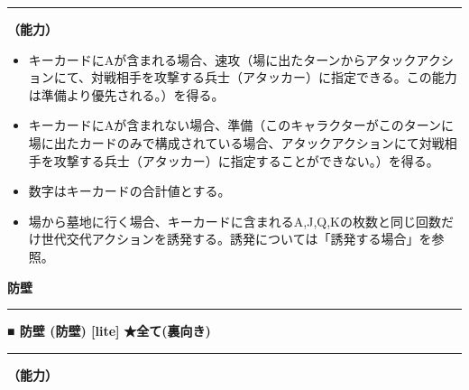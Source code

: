 \documentclass[twocolumn,a5paper,papersize,10pt]{jarticle}
\begin{document}
\vspace{1mm}%
\hrule height 0.1mm depth 0mm width 66.5mm %
\vspace{1mm}%

{\bf（能力）}


\vspace{-1zh}%
\begin{itemize}
\setlength{\leftskip}{-0.3cm}
\setlength{\parskip}{0pt} %

\item キーカードにAが含まれる場合、速攻（場に出たターンからアタックアクションにて、対戦相手を攻撃する兵士（アタッカー）に指定できる。この能力は準備より優先される。）を得る。

\item キーカードにAが含まれない場合、準備（このキャラクターがこのターンに場に出たカードのみで構成されている場合、アタックアクションにて対戦相手を攻撃する兵士（アタッカー）に指定することができない。）を得る。

\item 数字はキーカードの合計値とする。

\item 場から墓地に行く場合、キーカードに含まれるA,J,Q,Kの枚数と同じ回数だけ世代交代アクションを誘発する。誘発については「誘発する場合」を参照。
\vspace{-1zh}%
\end{itemize}


\begin{tcolorbox}
{\scriptsize\bf 防壁}
\end{tcolorbox}
\vspace{-1zh}%
\vspace{2mm} %
\hrule height 0.5mm depth 0mm width 66.5mm %
\vspace{1mm} %
{\small\bf ■ 防壁 {\scriptsize (防壁) [lite]}} %
\hfill 
{\footnotesize\bf ★全て(裏向き) }

\vspace{1mm}%
\hrule height 0.1mm depth 0mm width 66.5mm %
\vspace{1mm}%

{\bf（能力）}
\end{document}
